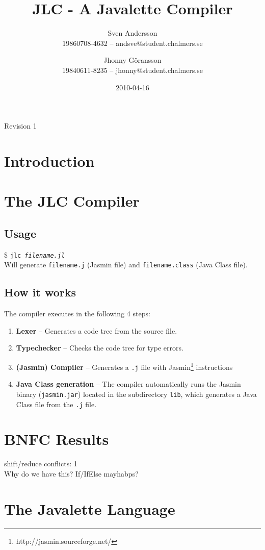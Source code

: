 \documentclass[]{article}
\title{JLC - A Javalette Compiler}
\author{Sven Andersson\\19860708-4632 -- andsve@student.chalmers.se
        \and Jhonny Göransson\\19840611-8235 -- jhonny@student.chalmers.se}
\date{2010-04-16}
\begin{document}
\ifpdf
{}
\else
{}
\fi

\maketitle
\begin{center}
  Revision 1
\end{center}



\section{Introduction}

\section{The JLC Compiler}
  \subsection*{Usage}
    \$ \texttt{jlc \textit{filename.jl}}\\
    Will generate \texttt{filename.j} (Jasmin file) and \texttt{filename.class} (Java Class file).
  
  \subsection*{How it works}
    The compiler executes in the following 4 steps:
    \begin{enumerate}
      \item \textbf{Lexer} -- Generates a code tree from the source file.
      \item \textbf{Typechecker} -- Checks the code tree for type errors.
      \item \textbf{(Jasmin) Compiler} -- Generates a \texttt{.j} file with Jasmin\footnote{http://jasmin.sourceforge.net/} instructions
      \item \textbf{Java Class generation} -- The compiler automatically runs the Jasmin binary (\texttt{jasmin.jar}) located in the subdirectory \texttt{lib}, which generates a Java Class file from the \texttt{.j} file.
    \end{enumerate}

\section{BNFC Results}
  shift/reduce conflicts:  1\\
  Why do we have this? If/IfElse mayhabps?

\section{The Javalette Language}




\end{document}
